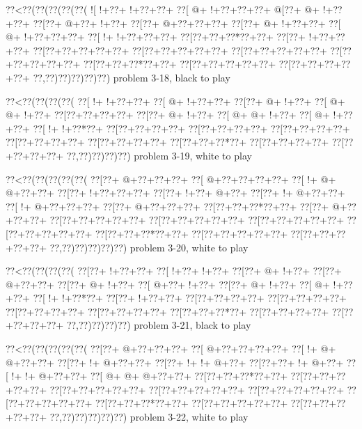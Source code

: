 \vbox{\vbox{\goo
\0??<\0??(\0??(\0??(\0??(\0??(
\- ![\- !+\0??+\- !+\0??+\0??+
\0??[\- @+\- !+\0??+\0??+\0??+
\- @[\0??+\- @+\- !+\0??+\0??+
\0??[\0??+\- @+\0??+\- !+\0??+
\0??[\0??+\- @+\0??+\0??+\0??+
\0??[\0??+\- @+\- !+\0??+\0??+
\0??[\- @+\- !+\0??+\0??+\0??+
\0??[\- !+\- !+\0??+\0??+\0??+
\0??[\0??+\0??+\0??*\0??+\0??+
\0??[\0??+\- !+\0??+\0??+\0??+
\0??[\0??+\0??+\0??+\0??+\0??+
\0??[\0??+\0??+\0??+\0??+\0??+
\0??[\0??+\0??+\0??+\0??+\0??+
\0??[\0??+\0??+\0??+\0??+\0??+
\0??[\0??+\0??+\0??*\0??+\0??+
\0??[\0??+\0??+\0??+\0??+\0??+
\0??[\0??+\0??+\0??+\0??+\0??+
\0??,\0??)\0??)\0??)\0??)\0??)
}
\hfil problem 3-18, black to play\hfil\break
}

\vbox{\vbox{\goo
\0??<\0??(\0??(\0??(\0??(
\0??[\- !+\- !+\0??+\0??+
\0??[\- @+\- !+\0??+\0??+
\0??[\0??+\- @+\- !+\0??+
\0??[\- @+\- @+\- !+\0??+
\0??[\0??+\0??+\0??+\0??+
\0??[\0??+\- @+\- !+\0??+
\0??[\- @+\- @+\- !+\0??+
\0??[\- @+\- !+\0??+\0??+
\0??[\- !+\- !+\0??*\0??+
\0??[\0??+\0??+\0??+\0??+
\0??[\0??+\0??+\0??+\0??+
\0??[\0??+\0??+\0??+\0??+
\0??[\0??+\0??+\0??+\0??+
\0??[\0??+\0??+\0??+\0??+
\0??[\0??+\0??+\0??*\0??+
\0??[\0??+\0??+\0??+\0??+
\0??[\0??+\0??+\0??+\0??+
\0??,\0??)\0??)\0??)\0??)
}
\hfil problem 3-19, white to play\hfil\break
}

\vbox{\vbox{\goo
\0??<\0??(\0??(\0??(\0??(\0??(
\0??[\0??+\- @+\0??+\0??+\0??+
\0??[\- @+\0??+\0??+\0??+\0??+
\0??[\- !+\- @+\- @+\0??+\0??+
\0??[\0??+\- !+\0??+\0??+\0??+
\0??[\0??+\- !+\0??+\- @+\0??+
\0??[\0??+\- !+\- @+\0??+\0??+
\0??[\- !+\- @+\0??+\0??+\0??+
\0??[\0??+\- @+\0??+\0??+\0??+
\0??[\0??+\0??+\0??*\0??+\0??+
\0??[\0??+\- @+\0??+\0??+\0??+
\0??[\0??+\0??+\0??+\0??+\0??+
\0??[\0??+\0??+\0??+\0??+\0??+
\0??[\0??+\0??+\0??+\0??+\0??+
\0??[\0??+\0??+\0??+\0??+\0??+
\0??[\0??+\0??+\0??*\0??+\0??+
\0??[\0??+\0??+\0??+\0??+\0??+
\0??[\0??+\0??+\0??+\0??+\0??+
\0??,\0??)\0??)\0??)\0??)\0??)
}
\hfil problem 3-20, white to play\hfil\break
}

\vbox{\vbox{\goo
\0??<\0??(\0??(\0??(\0??(
\0??[\0??+\- !+\0??+\0??+
\0??[\- !+\0??+\- !+\0??+
\0??[\0??+\- @+\- !+\0??+
\0??[\0??+\- @+\0??+\0??+
\0??[\0??+\- @+\- !+\0??+
\0??[\- @+\0??+\- !+\0??+
\0??[\0??+\- @+\- !+\0??+
\0??[\- @+\- !+\0??+\0??+
\0??[\- !+\- !+\0??*\0??+
\0??[\0??+\- !+\0??+\0??+
\0??[\0??+\0??+\0??+\0??+
\0??[\0??+\0??+\0??+\0??+
\0??[\0??+\0??+\0??+\0??+
\0??[\0??+\0??+\0??+\0??+
\0??[\0??+\0??+\0??*\0??+
\0??[\0??+\0??+\0??+\0??+
\0??[\0??+\0??+\0??+\0??+
\0??,\0??)\0??)\0??)\0??)
}
\hfil problem 3-21, black to play\hfil\break
}

\vbox{\vbox{\goo
\0??<\0??(\0??(\0??(\0??(\0??(
\0??[\0??+\- @+\0??+\0??+\0??+
\0??[\- @+\0??+\0??+\0??+\0??+
\0??[\- !+\- @+\- @+\0??+\0??+
\0??[\0??+\- !+\- @+\0??+\0??+
\0??[\0??+\- !+\- !+\- @+\0??+
\0??[\0??+\0??+\- !+\- @+\0??+
\0??[\- !+\- !+\- @+\0??+\0??+
\0??[\- @+\- @+\- @+\0??+\0??+
\0??[\0??+\0??+\0??*\0??+\0??+
\0??[\0??+\0??+\0??+\0??+\0??+
\0??[\0??+\0??+\0??+\0??+\0??+
\0??[\0??+\0??+\0??+\0??+\0??+
\0??[\0??+\0??+\0??+\0??+\0??+
\0??[\0??+\0??+\0??+\0??+\0??+
\0??[\0??+\0??+\0??*\0??+\0??+
\0??[\0??+\0??+\0??+\0??+\0??+
\0??[\0??+\0??+\0??+\0??+\0??+
\0??,\0??)\0??)\0??)\0??)\0??)
}
\hfil problem 3-22, white to play\hfil\break
}

